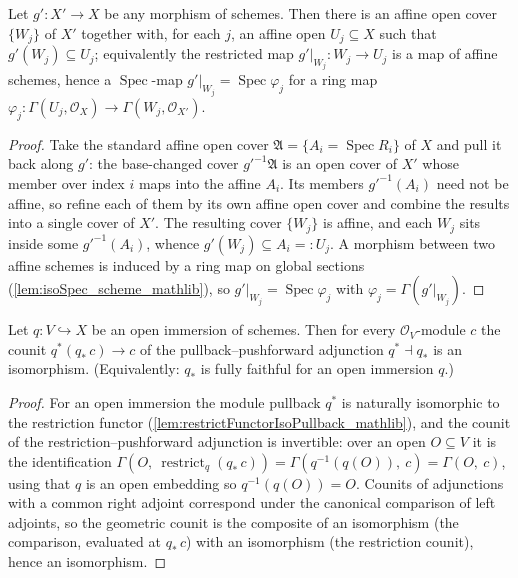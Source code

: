 \begin{lemma}
  \label{lem:openimm_refining_affine_cover}
  Let \(g' : X' \to X\) be any morphism of schemes. Then there is an affine open cover
  \(\{W_j\}\) of \(X'\) together with, for each \(j\), an affine open \(U_j \subseteq X\) such that
  \(g'(W_j) \subseteq U_j\); equivalently the restricted map \(g'|_{W_j} : W_j \to U_j\) is a map
  of affine schemes, hence a \(\operatorname{Spec}\)-map \(g'|_{W_j} = \operatorname{Spec}\varphi_j\)
  for a ring map \(\varphi_j : \Gamma(U_j, \mathcal{O}_X) \to \Gamma(W_j, \mathcal{O}_{X'})\).
\end{lemma}
\begin{proof}
  Take the standard affine open cover \(\mathfrak{A} = \{A_i = \operatorname{Spec} R_i\}\) of \(X\)
  and pull it back along \(g'\): the base-changed cover \(g'^{-1}\mathfrak{A}\) is an open cover of
  \(X'\) whose member over index \(i\) maps into the affine \(A_i\). Its members \(g'^{-1}(A_i)\)
  need not be affine, so refine each of them by its own affine open cover and combine the results
  into a single cover of \(X'\). The resulting cover \(\{W_j\}\) is affine, and each \(W_j\) sits
  inside some \(g'^{-1}(A_i)\), whence \(g'(W_j) \subseteq A_i =: U_j\). A morphism between two
  affine schemes is induced by a ring map on global sections (\cref{lem:isoSpec_scheme_mathlib}),
  so \(g'|_{W_j} = \operatorname{Spec}\varphi_j\) with \(\varphi_j = \Gamma(g'|_{W_j})\).
\end{proof}

\begin{lemma}
  \label{lem:openimm_pullback_counit_isIso}
  Let \(q : V \hookrightarrow X\) be an open immersion of schemes.  Then for every
  \(\mathcal{O}_V\)-module \(c\) the counit \(q^*(q_*\,c) \to c\) of the pullback--pushforward
  adjunction \(q^* \dashv q_*\) is an isomorphism.  (Equivalently: \(q_*\) is fully faithful for
  an open immersion \(q\).)
\end{lemma}
\begin{proof}\leanok
  For an open immersion the module pullback \(q^*\) is naturally isomorphic to the restriction
  functor (\cref{lem:restrictFunctorIsoPullback_mathlib}), and the counit of the
  restriction--pushforward adjunction is invertible: over an open \(O \subseteq V\) it is the
  identification \(\Gamma(O,\ \operatorname{restrict}_q (q_*\,c)) = \Gamma(q^{-1}(q(O)),\ c) =
  \Gamma(O,\ c)\), using that \(q\) is an open embedding so \(q^{-1}(q(O)) = O\).  Counits of
  adjunctions with a common right adjoint correspond under the canonical comparison of left
  adjoints, so the geometric counit is the composite of an isomorphism (the comparison, evaluated
  at \(q_*\,c\)) with an isomorphism (the restriction counit), hence an isomorphism.
\end{proof}

